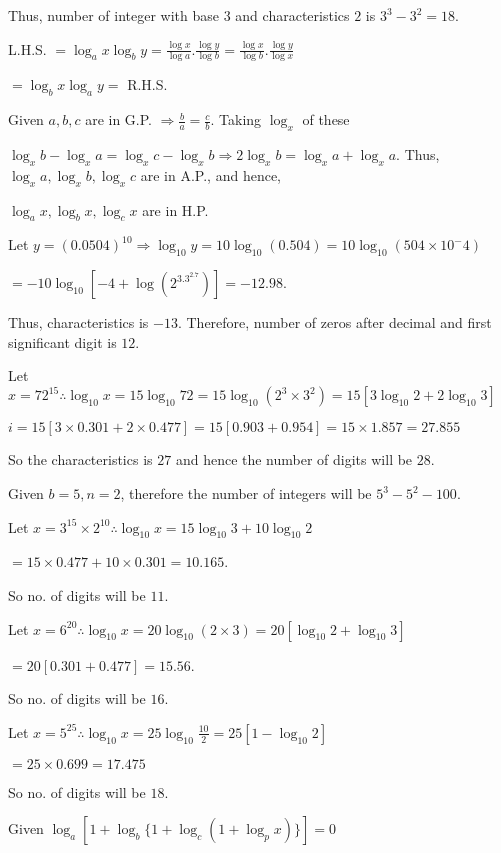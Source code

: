   Thus, number of integer with base $3$ and characteristics $2$ is $3^3 - 3^2 = 18$.
\item L.H.S. $=\log_ax\log_by = \frac{\log x}{\log a}.\frac{\log y}{\log b} = \frac{\log x}{\log b}.\frac{\log y}{\log x}$

  $= \log_bx\log_ay =$ R.H.S.
\item Given $a, b, c$ are in G.P. $\Rightarrow \frac{b}{a} = \frac{c}{b}$. Taking $\log_x$ of these

  $\log_xb - \log_xa = \log_xc - \log_xb \Rightarrow 2\log_xb = \log_xa + \log_xa$. Thus, $\log_xa, \log_xb, \log_xc$
  are in A.P., and hence,

  $\log_ax, \log_bx, \log_cx$ are in H.P.
\item Let $y = (0.0504)^{10} \Rightarrow \log_{10}y = 10\log_{10}(0.504) = 10\log_{10}(504\times10^-4)$

  $= -10\log_{10}[-4 + \log(2^3.3^2.7)] = -12.98$.

  Thus, characteristics is $-13$. Therefore, number of zeros after decimal and first significant digit is $12$.
\item Let $x = 72^{15} \therefore \log_{10}x = 15\log_{10}72 = 15\log_{10}(2^3\times3^2) = 15[3\log_{10}2 + 2\log_{10}3]$

  $i = 15[3\times0.301 + 2\times0.477] = 15[0.903 + 0.954] = 15\times1.857 = 27.855$

  So the characteristics is $27$ and hence the number of digits will be $28$.
\item Given $b = 5, n = 2$, therefore the number of integers will be $5^3 - 5^2 - 100$.
\item Let $x = 3^{15}\times 2^{10} \therefore \log_{10}x = 15\log_{10}3 + 10\log_{10}2$

  $= 15\times0.477 + 10\times 0.301 = 10.165$.

  So no. of digits will be $11$.
\item Let $x = 6^{20} \therefore \log_{10}x = 20\log_{10}(2\times3) = 20[\log_{10}2 + \log_{10}3]$

  $= 20[0.301 + 0.477] = 15.56$.

  So no. of digits will be $16$.
\item Let $x = 5^{25} \therefore \log_{10}x = 25\log_{10}\frac{10}{2}= 25[1 - \log_{10}2]$

  $= 25\times 0.699 = 17.475$

  So no. of digits will be $18$.
\item Given $\log_a[1 + \log_b\{1 + \log_c(1 + \log_px)\}] = 0$

